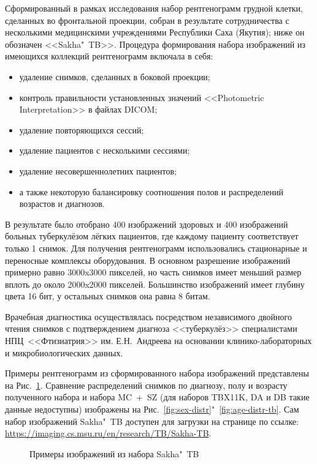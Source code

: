 Сформированный в рамках исследования набор рентгенограмм грудной клетки, сделанных во фронтальной проекции, собран в результате сотрудничества с несколькими медицинскими учреждениями Республики Саха (Якутия); ниже он обозначен <<Sakha"~TB>>. Процедура формирования набора изображений из имеющихся коллекций рентгенограмм включала в себя:

\begin{itemize}
	\item удаление снимков, сделанных в боковой проекции;
	\item контроль правильности установленных значений <<Photometric Interpretation>> в файлах DICOM;
	\item удаление повторяющихся сессий;
	\item удаление пациентов с несколькими сессиями;%
	\item удаление несовершеннолетних пациентов;
	\item а также некоторую балансировку соотношения полов и распределений возрастов и диагнозов.
\end{itemize}

В результате было отобрано 400 изображений здоровых и 400 изображений больных туберкулёзом лёгких пациентов, где каждому пациенту соответствует только 1 снимок. Для получения рентгенограмм использовались стационарные и переносные комплексы оборудования. В основном разрешение изображений примерно равно 3000x3000 пикселей, но часть снимков имеет меньший размер вплоть до около 2000x2000 пикселей. Большинство изображений имеет глубину цвета 16 бит, у остальных снимков она равна 8 битам.

Врачебная диагностика осуществлялась посредством независимого двойного чтения снимков с подтверждением диагноза <<туберкулёз>> специалистами НПЦ~<<Фтизиатрия>> им. Е.Н.~Андреева на основании клинико-лабораторных и микробиологических данных.

Примеры рентгенограмм из сформированного набора изображений представлены на Рис.~\ref{fig:samples-yak-2}. Сравнение распределений снимков по диагнозу, полу и возрасту полученного набора и набора MC~+~SZ (для наборов TBX11K, DA и DB такие данные недоступны) изображены на Рис.~\ref{fig:sex-distr}"~\ref{fig:age-distr-tb}. Сам набор изображений Sakha"~TB доступен для загрузки на странице по ссылке: \url{https://imaging.cs.msu.ru/en/research/TB/Sakha-TB}.

\begin{figure}[ht]
	\caption{Примеры изображений из набора Sakha"~TB}
	\label{fig:samples-yak-2}
\end{figure}

